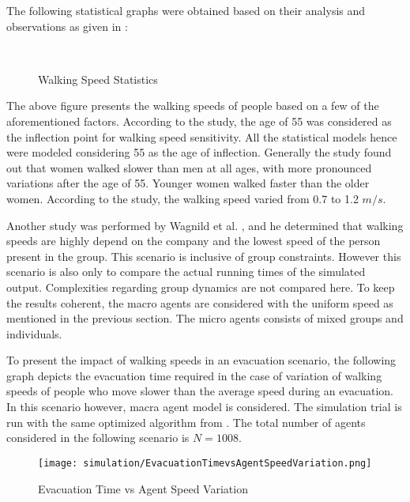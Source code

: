 The following statistical graphs were obtained based on their analysis and observations as given in \cite{ref29}:

\begin{figure}[H]
\\
\caption{Walking Speed Statistics}
\label{Walking Speed Statistics}
\end{figure}

The above figure presents the walking speeds of people based on a few of the aforementioned factors. According to the study, the age of 55 was considered as the inflection point for walking speed sensitivity. All the statistical models hence were modeled considering 55 as the age of inflection. Generally the study found out that women walked slower than men at all ages, with more pronounced variations after the age of 55. Younger women walked faster than the older women. According to the study, the walking speed varied from 0.7 to 1.2 $m/s$.

Another study was performed by Wagnild et al. \cite{ref24}, and he determined that walking speeds are highly depend on the company and the lowest speed of the person present in the group. This scenario is inclusive of group constraints. However this scenario is also only to compare the actual running times of the simulated output. Complexities regarding group dynamics are not compared here. To keep the results coherent, the macro agents are considered with the uniform speed as mentioned in the previous section. The micro agents consists of mixed groups and individuals. 

To present the impact of walking speeds in an evacuation scenario, the following graph depicts the evacuation time required in the case of variation of walking speeds of people who move slower than the average speed during an evacuation. In this scenario however, macra agent model is considered. The simulation trial is run with the same optimized algorithm from \cite{ref5}. The total number of agents considered in the following scenario is $N = 1008$.

\begin{figure}[H]
  \centering
  \texttt{[image: simulation/EvacuationTimevsAgentSpeedVariation.png]}
  \caption{Evacuation Time vs Agent Speed Variation}
  \label{Evacuation Time vs Agent Speed Variation}
\end{figure}

